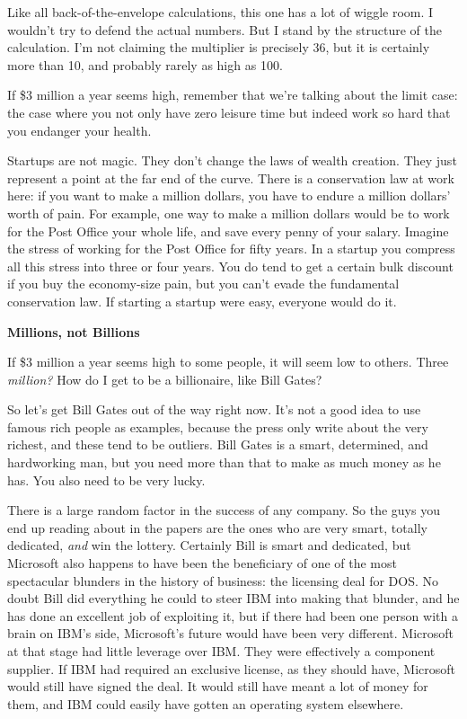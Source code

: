 Like all back-of-the-envelope calculations, this one has a lot of wiggle
room. I wouldn't try to defend the actual numbers. But I stand by the
structure of the calculation. I'm not claiming the multiplier is
precisely 36, but it is certainly more than 10, and probably rarely as
high as 100.

If \$3 million a year seems high, remember that we're talking about the
limit case: the case where you not only have zero leisure time but
indeed work so hard that you endanger your health.

Startups are not magic. They don't change the laws of wealth creation.
They just represent a point at the far end of the curve. There is a
conservation law at work here: if you want to make a million dollars,
you have to endure a million dollars' worth of pain. For example, one
way to make a million dollars would be to work for the Post Office your
whole life, and save every penny of your salary. Imagine the stress of
working for the Post Office for fifty years. In a startup you compress
all this stress into three or four years. You do tend to get a certain
bulk discount if you buy the economy-size pain, but you can't evade the
fundamental conservation law. If starting a startup were easy, everyone
would do it.

\textbf{Millions, not Billions}

If \$3 million a year seems high to some people, it will seem low to
others. Three \emph{million?} How do I get to be a billionaire, like
Bill Gates?

So let's get Bill Gates out of the way right now. It's not a good idea
to use famous rich people as examples, because the press only write
about the very richest, and these tend to be outliers. Bill Gates is a
smart, determined, and hardworking man, but you need more than that to
make as much money as he has. You also need to be very lucky.

There is a large random factor in the success of any company. So the
guys you end up reading about in the papers are the ones who are very
smart, totally dedicated, \emph{and} win the lottery. Certainly Bill is
smart and dedicated, but Microsoft also happens to have been the
beneficiary of one of the most spectacular blunders in the history of
business: the licensing deal for DOS. No doubt Bill did everything he
could to steer IBM into making that blunder, and he has done an
excellent job of exploiting it, but if there had been one person with a
brain on IBM's side, Microsoft's future would have been very different.
Microsoft at that stage had little leverage over IBM. They were
effectively a component supplier. If IBM had required an exclusive
license, as they should have, Microsoft would still have signed the
deal. It would still have meant a lot of money for them, and IBM could
easily have gotten an operating system elsewhere.

